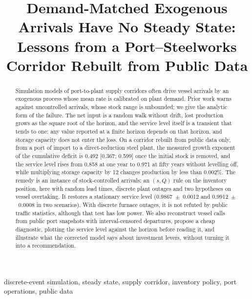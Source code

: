 \documentclass[conference]{IEEEtran}   %
\begin{document}
\title{Demand-Matched Exogenous Arrivals Have No Steady State:\\
Lessons from a Port--Steelworks Corridor Rebuilt from Public Data}

\author{
}

\maketitle

\begin{abstract}
Simulation models of port-to-plant supply corridors often drive vessel arrivals by an
exogenous process whose mean rate is calibrated on plant demand. Prior work warns against
uncontrolled arrivals, whose stock range is unbounded; we give the analytic form of the
failure. The net input is a random walk without drift, lost production grows as the square
root of the horizon, and the service level itself is a transient that tends to one: any value
reported at a finite horizon depends on that horizon, and storage capacity does not enter
the loss. On a corridor rebuilt from public data only, from a port of import to a
direct-reduction steel plant, the measured growth exponent of the cumulative deficit is
0.492 [0.367; 0.599] once the initial stock is removed, and the service level rises from 0.858
at one year to 0.971 at fifty years without levelling off, while multiplying storage capacity by 12 changes production by less
than 0.002\%. The remedy is an instance of stock-controlled arrivals: an $(s,Q)$ rule on the
inventory position, here with random lead times, discrete plant outages and two hypotheses
on vessel overtaking. It restores a stationary service level
(0.9867~$\pm$~0.0012 and 0.9912~$\pm$~0.0008 in two scenarios). With discrete furnace
outages, it is not refuted by public traffic statistics, although that test has low power.
We also reconstruct vessel calls from public port snapshots with interval-censored
departures, propose a cheap diagnostic, plotting the service level against the horizon
before reading it, and illustrate what the corrected model says about investment levers,
without turning it into a recommendation.
\end{abstract}

\begin{IEEEkeywords}
discrete-event simulation, steady state, supply corridor, inventory policy, port operations,
public data
\end{IEEEkeywords}
\end{document}

